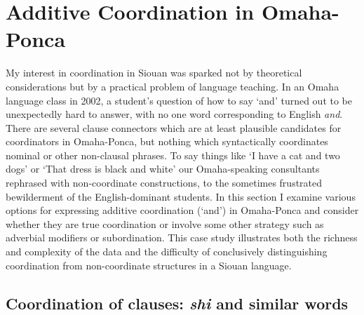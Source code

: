 \documentclass[output=paper]{LSP/langsci}
\begin{document}
\section{Additive Coordination in Omaha-Ponca}

My interest in coordination in Siouan was sparked not by theoretical considerations but by a practical problem of language teaching. In an Omaha language class in 2002, a student's question of how to say `and' turned out to be unexpectedly hard to answer, with no one word corresponding to English \textit{and}. There are several clause connectors which are at least plausible candidates for coordinators in Omaha-Ponca, but nothing which syntactically coordinates nominal or other non-clausal phrases. To say things like `I have a cat and two dogs' or `That dress is black and white' our Omaha-speaking consultants rephrased with non-coordinate constructions, to the sometimes frustrated bewilderment of the English-dominant students.  In this section I examine various options for expressing additive coordination (`and') in Omaha-Ponca and consider whether they are true coordination or involve some other strategy such as adverbial modifiers or subordination. This case study illustrates both the richness and complexity of the data and the difficulty of conclusively distinguishing coordination from non-coordinate structures in a Siouan language.

\subsection{Coordination of clauses: \textit{shi}  and similar words}  
\end{document}
